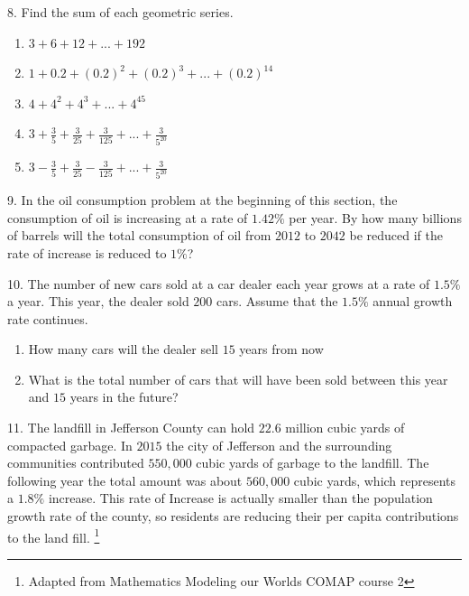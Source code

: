 \documentclass[10pt,]{book}
\theoremstyle{plain}
\theoremstyle{definition}
\theoremstyle{definition}
\theoremstyle{definition}
\numberwithin{equation}{section}
\begin{document}
\begin{exerciselist}
\par\smallskip
\item[8.]\hypertarget{exercise-39}{}\hypertarget{p-180}{}%
Find the sum of each geometric series.%
\leavevmode%
\begin{enumerate}[label=(\alph*)]
\item\hypertarget{li-83}{}\(3 + 6 + 12 + ... + 192\)%
\item\hypertarget{li-84}{}\(1 + 0.2 + (0.2)^2 + (0.2)^3 + ... + (0.2)^14\)%
\item\hypertarget{li-85}{}\(4 + 4^2 + 4^3 + ... + 4^45\)%
\item\hypertarget{li-86}{}\(3 + \frac{3}{5} + \frac{3}{25} + \frac{3}{125} + ... + \frac{3}{5^{20}}\)%
\item\hypertarget{li-87}{}\(3 - \frac{3}{5} + \frac{3}{25} - \frac{3}{125} + ... + \frac{3}{5^{20}}\)%
\end{enumerate}
\par\smallskip
\item[9.]\hypertarget{exercise-40}{}\hypertarget{p-181}{}%
In the oil consumption problem at the beginning of this section, the consumption of oil is increasing at a rate of \(1.42\%\) per year. By how many billions of barrels will the total consumption of oil from \(2012\) to \(2042\) be reduced if the rate of increase is reduced to \(1\%\)?%
\par\smallskip
\item[10.]\hypertarget{exercise-41}{}\hypertarget{p-182}{}%
The number of new cars sold at a car dealer each year grows at a rate of \(1.5\%\) a year. This year, the dealer sold \(200\) cars. Assume that the \(1.5\%\) annual growth rate continues.%
\leavevmode%
\begin{enumerate}[label=(\alph*)]
\item\hypertarget{li-88}{}How many cars will the dealer sell \(15\) years from now%
\item\hypertarget{li-89}{}What is the total number of cars that will have been sold between this year and \(15\) years in the future?%
\end{enumerate}
\par\smallskip
\item[11.]\hypertarget{exercise-42}{}\hypertarget{p-183}{}%
The landfill in Jefferson County can hold \(22.6\) million cubic yards of compacted garbage. In \(2015\) the city of Jefferson and the surrounding communities contributed \(550,000\) cubic yards of garbage to the landfill. The following year the total amount was about \(560,000\) cubic yards, which represents a \(1.8\%\) increase. This rate of Increase is actually smaller than the population growth rate of the county, so residents are reducing their per capita contributions to the land fill. \footnote{Adapted from Mathematics Modeling our Worlds COMAP course 2\label{fn-2}}%

\end{exerciselist}
\end{document}
